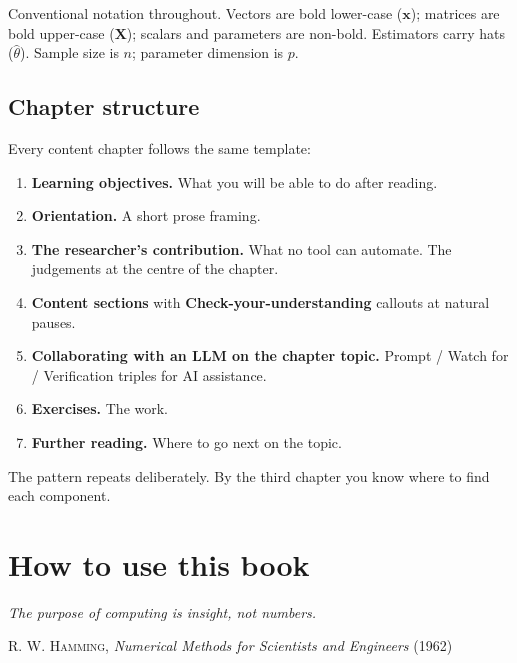 \documentclass[
  letterpaper,
  11pt]{scrbook}
\providecommand{\tightlist}{%
  \setlength{\itemsep}{0pt}\setlength{\parskip}{0pt}}
\begin{document}

Conventional notation throughout. Vectors are bold lower-case
(\(\mathbf{x}\)); matrices are bold upper-case (\(\mathbf{X}\)); scalars
and parameters are non-bold. Estimators carry hats (\(\hat\theta\)).
Sample size is \(n\); parameter dimension is \(p\).

\section*{Chapter structure}\label{chapter-structure}


Every content chapter follows the same template:

\begin{enumerate}
\def\labelenumi{\arabic{enumi}.}
\tightlist
\item
  \textbf{Learning objectives.} What you will be able to do after
  reading.
\item
  \textbf{Orientation.} A short prose framing.
\item
  \textbf{The researcher's contribution.} What no tool can automate. The
  judgements at the centre of the chapter.
\item
  \textbf{Content sections} with \textbf{Check-your-understanding}
  callouts at natural pauses.
\item
  \textbf{Collaborating with an LLM on the chapter topic.} Prompt /
  Watch for / Verification triples for AI assistance.
\item
  \textbf{Exercises.} The work.
\item
  \textbf{Further reading.} Where to go next on the topic.
\end{enumerate}

The pattern repeats deliberately. By the third chapter you know where to
find each component.


\chapter*{How to use this book}\label{how-to-use-this-book}


\begin{flushright}\small

\emph{The purpose of computing is insight, not numbers.}

\textsc{R. W. Hamming}, \emph{Numerical Methods for Scientists and
Engineers} (1962)

\end{flushright}
\end{document}
